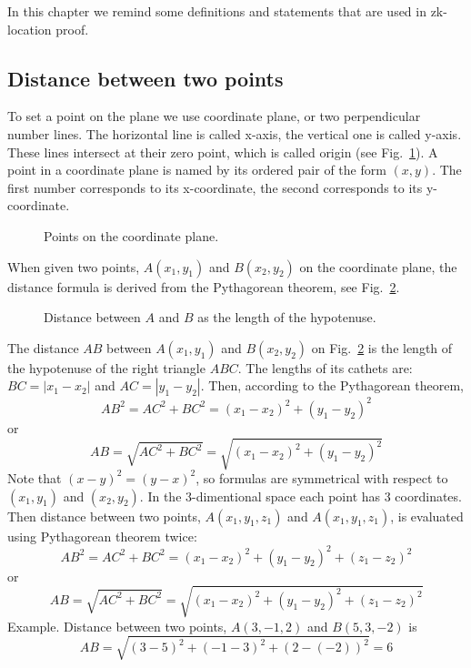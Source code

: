 \documentclass{article}
\begin{document}
In this chapter we remind some definitions and statements that are used in zk-location proof.

\subsection{Distance between two points}  %

To set a point on the plane we use coordinate plane, or two perpendicular number lines.
The horizontal line is called x-axis, the vertical one is called y-axis.
These lines intersect at their zero point, which is called origin (see Fig.~\ref{fig-2}).
A point in a coordinate plane is named by its ordered pair of the form $(x, y)$.
The first number corresponds to its x-coordinate, the second corresponds to its y-coordinate.
\begin{figure}
  \centering
  \def\svgwidth{\columnwidth}
  
\caption{Points on the coordinate plane.}
\label{fig-2}
\end{figure}
%
When given two points, $A(x_1, y_1)$ and $B(x_2, y_2)$ on the coordinate plane, the distance formula is derived from the Pythagorean theorem, see Fig.~\ref{fig-3}.
\begin{figure}
  \centering
  \def\svgwidth{\columnwidth}
  
\caption{Distance between $A$ and $B$ as the length of the hypotenuse.}
\label{fig-3}
\end{figure}
%
The distance $AB$ between $A(x_1, y_1)$ and $B(x_2, y_2)$ on Fig.~\ref{fig-3} is the length of the hypotenuse of the right triangle $ABC$.
The lengths of its cathets are: $BC = |x_1 - x_2|$ and $AC = |y_1 - y_2|$.
 Then, according to the Pythagorean theorem,
\begin{equation}
  AB^2 = AC^2 + BC^2 = (x_1 - x_2)^2 + (y_1 - y_2)^2
\end{equation}
or
\begin{equation}
  AB = \sqrt{AC^2 + BC^2} = \sqrt{(x_1 - x_2)^2 + (y_1 - y_2)^2}
\end{equation}
Note that $(x - y)^2 = (y - x)^2$, so formulas are symmetrical with respect to $(x_1, y_1)$ and $(x_2, y_2)$.
In the 3-dimentional space each point has 3 coordinates.
Then distance between two points, $A(x_1, y_1, z_1)$ and $A(x_1, y_1, z_1)$, is evaluated using Pythagorean theorem twice:
\begin{equation}
  AB^2 = AC^2 + BC^2 = (x_1 - x_2)^2 + (y_1 - y_2)^2 + (z_1 - z_2)^2
\end{equation}
or
\begin{equation}
  AB = \sqrt{AC^2 + BC^2} = \sqrt{(x_1 - x_2)^2 + (y_1 - y_2)^2 + (z_1 - z_2)^2}
\end{equation}
Example.
Distance between two points, $A(3, -1, 2)$ and $B(5, 3, -2)$ is
\begin{equation}
  AB = \sqrt{(3 - 5)^2 + (-1 - 3)^2 + (2 - (-2))^2} = 6
\end{equation}
\end{document}

